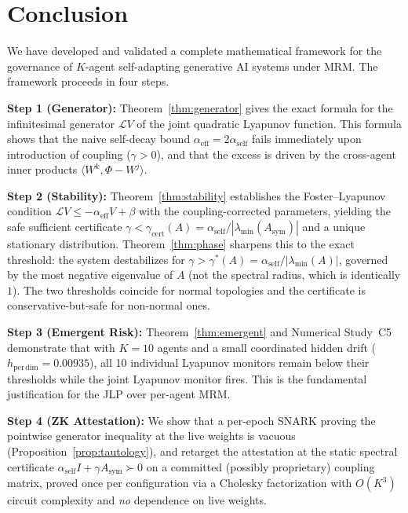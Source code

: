 \documentclass[12pt]{article}
\theoremstyle{plain}
\theoremstyle{definition}
\newcommand{\Lgen}{\mathcal{L}}
\newcommand{\abs}[1]{\left| #1 \right|}
\newcommand{\ip}[2]{\langle #1, #2 \rangle}
\begin{document}
\section{Conclusion}
\label{sec:conclusion}

We have developed and validated a complete mathematical framework for
the governance of $K$-agent self-adapting generative AI systems under
MRM.  The framework proceeds in four steps.

\textbf{Step 1 (Generator):} Theorem~\ref{thm:generator} gives the
exact formula for the infinitesimal generator $\Lgen V$ of the joint
quadratic Lyapunov function.  This formula shows that the naive
self-decay bound $\alpha_{\mathrm{eff}} = 2\alpha_{\mathrm{self}}$
fails immediately upon introduction of coupling ($\gamma > 0$), and
that the excess is driven by the cross-agent inner products
$\ip{W^k}{\Phi - W^j}$.

\textbf{Step 2 (Stability):} Theorem~\ref{thm:stability} establishes
the Foster--Lyapunov condition $\Lgen V \leq -\alpha_{\mathrm{eff}} V
+ \beta$ with the coupling-corrected parameters, yielding the safe
sufficient certificate $\gamma<\gamma_{\mathrm{cert}}(A)=\alpha_{\mathrm{self}}/\abs{\lambda_{\min}(A_{\mathrm{sym}})}$
and a unique stationary distribution.  Theorem~\ref{thm:phase} sharpens
this to the exact threshold: the system destabilizes for
$\gamma>\gamma^*(A)=\alpha_{\mathrm{self}}/\abs{\lambda_{\min}(A)}$, governed
by the most negative eigenvalue of $A$ (not the spectral radius, which is
identically $1$).  The two thresholds coincide for normal topologies and
the certificate is conservative-but-safe for non-normal ones.

\textbf{Step 3 (Emergent Risk):} Theorem~\ref{thm:emergent} and
Numerical Study~C5 demonstrate that with $K=10$ agents and a small
coordinated hidden drift ($h_{\mathrm{per\,dim}} = 0.00935$), all
10 individual Lyapunov monitors remain below their thresholds while
the joint Lyapunov monitor fires.  This is the fundamental
justification for the JLP over per-agent MRM.

\textbf{Step 4 (ZK Attestation):} We show that a per-epoch SNARK proving the
pointwise generator inequality at the live weights is vacuous
(Proposition~\ref{prop:tautology}), and retarget the attestation at the
static spectral certificate $\alpha_{\mathrm{self}}I+\gamma A_{\mathrm{sym}}\succ0$
on a committed (possibly proprietary) coupling matrix, proved once per
configuration via a Cholesky factorization with $O(K^3)$ circuit complexity
and \emph{no} dependence on live weights.
\end{document}
